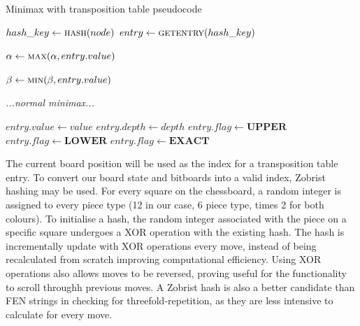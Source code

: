 \documentclass[../main/main.tex]{subfiles}
\begin{document}
\begin{algorithm}
\caption{Minimax with transposition table pseudocode}
\begin{algorithmic}
        \State $hash\_key \gets \Call{hash}{node}$
        \State $entry \gets \Call{getentry}{hash\_key}$

        \bigskip

                \State {}
                \State $\alpha \gets \Call{max}{\alpha, entry.value}$

                \State $\beta \gets \Call{min}{\beta, entry.value}$
            \EndIf

            \If{$\alpha\geq\beta$}
                \State {}
            \EndIf
        \EndIf

        \bigskip

        \textit{...normal minimax...}

        \bigskip

        \State $entry.value \gets value$
        \State $entry.depth \gets depth$
            \State $entry.flag \gets \textbf{UPPER}$
            \State $entry.flag \gets \textbf{LOWER}$
        \Else
            \State $entry.flag \gets \textbf{EXACT}$
        \EndIf

        \bigskip

    \EndFunction
\end{algorithmic}
\end{algorithm}

The current board position will be used as the index for a transposition table entry. To convert our board state and bitboards into a valid index, Zobrist hashing may be used. For every square on the chessboard, a random integer is assigned to every piece type (12 in our case, 6 piece type, times 2 for both colours). To initialise a hash, the random integer associated with the piece on a specific square undergoes a XOR operation with the existing hash. The hash is incrementally update with XOR operations every move, instead of being recalculated from scratch improving computational efficiency. Using XOR operations also allows moves to be reversed, proving useful for the functionality to scroll throughh previous moves. A Zobrist hash is also a better candidate than FEN strings in checking for threefold-repetition, as they are less intensive to calculate for every move.
\end{document}
